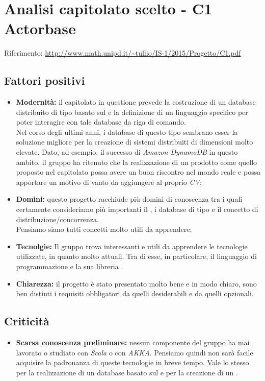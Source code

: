 \documentclass{scalatekids-article}
\begin{document}
\section{Analisi capitolato scelto - C1 Actorbase}
Riferimento: \url{http://www.math.unipd.it/~tullio/IS-1/2015/Progetto/C1.pdf}\\
\subsection{Fattori positivi}
\begin{itemize}
\item \textbf{Modernità:} il capitolato in questione prevede la costruzione di un database  distribuito di tipo  basato sul  e la definizione di un linguaggio specifico per poter interagire con tale database da riga di comando.\\
  Nel corso degli ultimi anni, i database di questo tipo sembrano esser la soluzione migliore per la creazione di sistemi distribuiti di dimensioni molto elevate. Dato, ad esempio, il successo di \textit{Amazon DynamoDB} in questo ambito, il gruppo ha ritenuto che la realizzazione di un prodotto come quello proposto nel capitolato possa avere un buon riscontro nel mondo reale e possa apportare un motivo di vanto da aggiungere al proprio \textit{CV};
\item \textbf{Domini:} questo progetto racchiude più domini di conoscenza tra i quali certamente consideriamo più importanti il , i database  di tipo  e il concetto di distribuzione/concorrenza. \\
  Pensiamo siano tutti concetti molto utili da apprendere;
\item \textbf{Tecnolgie:} Il gruppo trova interessanti e utili da apprendere le tecnologie utilizzate, in quanto molto attuali. Tra di esse, in particolare, il linguaggio di programmazione \textit{} e la sua libreria \textit{}.

\item \textbf{Chiarezza:} il progetto è stato presentato molto bene e in modo chiaro, sono ben distinti i requisiti obbligatori da quelli desiderabili e da quelli opzionali.
\end{itemize}
\subsection{Criticità}
\begin{itemize}
\item \textbf{Scarsa conoscenza preliminare:} nessun componente del gruppo ha mai lavorato o studiato con \textit{Scala} o con \textit{AKKA}. Pensiamo quindi non sarà facile acquisire la padronanza di queste tecnologie in breve tempo.
  Vale lo stesso per la realizzazione di un database basato sul  e per la creazione di un .
\end{itemize}
\end{document}
